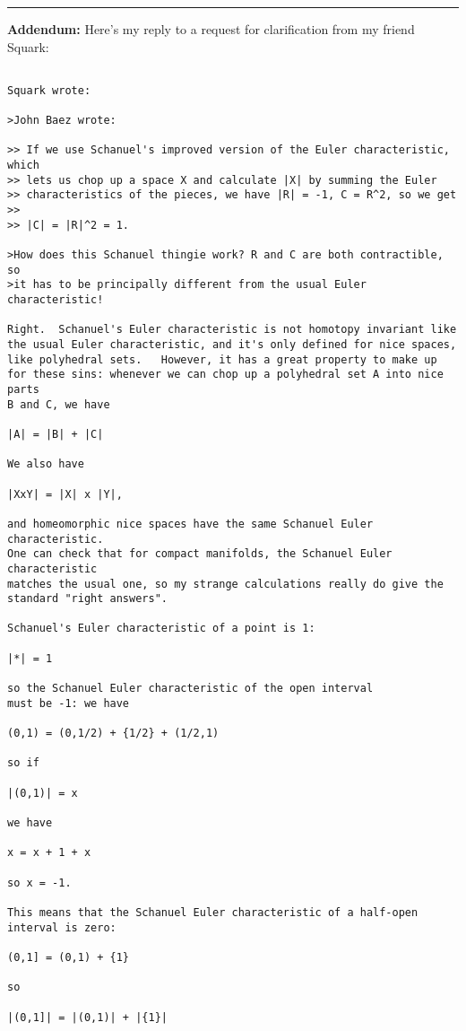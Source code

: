 \par\noindent\rule{\textwidth}{0.4pt}

\textbf{Addendum:} Here's my reply to a request for clarification
from my friend Squark:


\begin{verbatim}

Squark wrote:

>John Baez wrote:

>> If we use Schanuel's improved version of the Euler characteristic, which
>> lets us chop up a space X and calculate |X| by summing the Euler
>> characteristics of the pieces, we have |R| = -1, C = R^2, so we get
>> 
>> |C| = |R|^2 = 1.

>How does this Schanuel thingie work? R and C are both contractible, so
>it has to be principally different from the usual Euler characteristic!

Right.  Schanuel's Euler characteristic is not homotopy invariant like 
the usual Euler characteristic, and it's only defined for nice spaces,
like polyhedral sets.   However, it has a great property to make up 
for these sins: whenever we can chop up a polyhedral set A into nice parts 
B and C, we have

|A| = |B| + |C|

We also have

|XxY| = |X| x |Y|, 

and homeomorphic nice spaces have the same Schanuel Euler characteristic.
One can check that for compact manifolds, the Schanuel Euler characteristic
matches the usual one, so my strange calculations really do give the
standard "right answers".

Schanuel's Euler characteristic of a point is 1:

|*| = 1

so the Schanuel Euler characteristic of the open interval
must be -1: we have

(0,1) = (0,1/2) + {1/2} + (1/2,1)

so if 

|(0,1)| = x

we have

x = x + 1 + x

so x = -1.

This means that the Schanuel Euler characteristic of a half-open
interval is zero:

(0,1] = (0,1) + {1}

so 

|(0,1]| = |(0,1)| + |{1}|


\end{verbatim}

